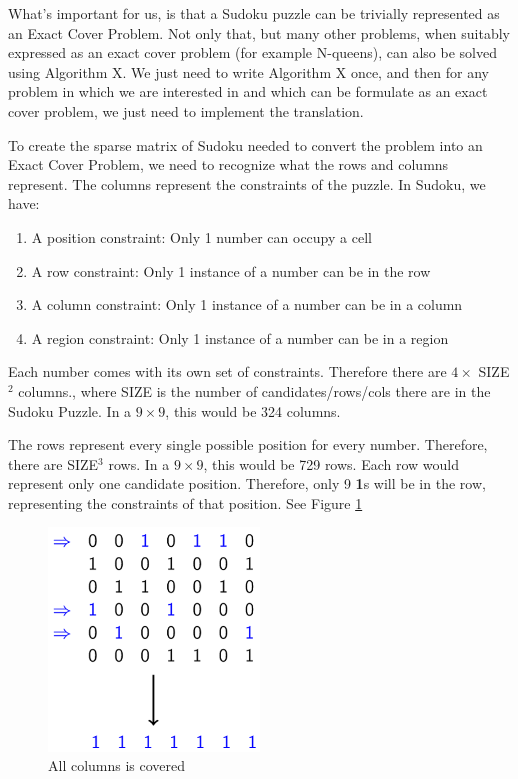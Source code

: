 		What’s important for us, is that a Sudoku puzzle can be trivially represented as an Exact Cover Problem. 
		Not only that, but many other problems, when suitably expressed as an exact cover problem (for example N-queens), can also be solved using Algorithm X. We just need to write Algorithm X once, and then for any problem in which we are interested in and which can be formulate as an exact cover problem, we just need to implement the translation.

		To create the sparse matrix of Sudoku needed to convert the problem into an Exact Cover Problem, we need to recognize what the rows and columns represent. The columns represent the constraints of the puzzle. In Sudoku, we have:

		\begin{enumerate}
		\item A position constraint: Only 1 number can occupy a cell
		\item A row constraint: Only 1 instance of a number can be in the row
		\item A column constraint: Only 1 instance of a number can be in a column
		\item A region constraint: Only 1 instance of a number can be in a region
		\end{enumerate}

		Each number comes with its own set of constraints. Therefore there are $4 \times$ SIZE$^2$ columns., where SIZE is the number of candidates/rows/cols there are in the Sudoku Puzzle. In a $9 \times 9$, this would be 324 columns.

		The rows represent every single possible position for every number. Therefore, there are SIZE$^3$ rows. In a $9 \times 9$, this would be 729 rows. Each row would represent only one candidate position. Therefore, only 9 \textbf{1}s will be in the row, representing the constraints of that position. See Figure \ref{fig:DLX}

		\begin{figure}[ht]
		\centering
		\includegraphics[width=0.5\textwidth]{figure/DLX.png}
		\caption{All columns is covered}
		\label{fig:DLX}
		\end{figure}

